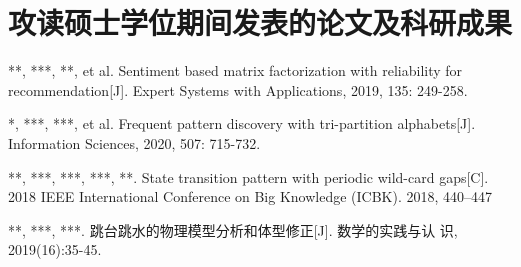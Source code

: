 \chapter{攻读硕士学位期间发表的论文及科研成果}
\begin{enumerate}[label={[}\arabic*{]}, leftmargin=*]
    \item ***, ***, **, et al. Sentiment based matrix factorization with reliability for recommendation[J]. Expert Systems with Applications, 2019, 135: 249-258.
    \item **, ***, ***, et al. Frequent pattern discovery with tri-partition alphabets[J]. Information Sciences, 2020, 507: 715-732.
    \item ***, ***, ***, ***, **. State transition pattern with periodic wild-card gaps[C]. 2018 IEEE International Conference on Big Knowledge (ICBK). 2018, 440–447
    \item ***, ***, ***. 跳台跳水的物理模型分析和体型修正[J]. 数学的实践与认 识, 2019(16):35-45.
\end{enumerate}